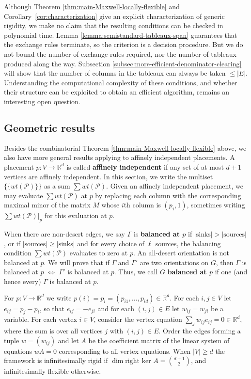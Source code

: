 \documentclass[11pt,letterpaper]{amsart}
\theoremstyle{definition}
\begin{document}
Although Theorem \ref{thm:main-Maxwell-locally-flexible} and Corollary~\ref{cor:characterization} give an explicit characterization of generic rigidity, we make no claim that the resulting conditions can be checked in polynomial time. Lemma \ref{lemma:semistandard-tableaux-span} guarantees that the exchange rules terminate, so the criterion is a decision procedure.
But we do not bound the number of exchange rules required, nor the number of tableaux produced along the way. Subsection \ref{subsec:more-efficient-denominator-clearing} will show that the number of columns in the tableaux can always be taken $\leq |E|$.
Understanding the computational complexity of these conditions, and whether their structure can be exploited to obtain an efficient algorithm, remains an interesting open question.


\subsection{Geometric results}
Besides the combinatorial Theorem \ref{thm:main-Maxwell-locally-flexible} above, we also have more general results applying to affinely independent placements. A placement $p:V \to \mathbb{R}^d$ is called \textbf{affinely independent} if any set of at most $d+1$ vertices are affinely independent. In this section, we write the multiset $\{\{ wt(\mathcal{P}) \}\}$ as a sum $\sum wt(\mathcal{P})$. Given an affinely independent placement, we may evaluate $\sum wt(\mathcal{P})$ at $p$ by replacing each column with the corresponding maximal minor of the matrix $M$ whose $i$th column is $(p_i, 1)$, sometimes writing $\sum wt(\mathcal{P})|_p$ for this evaluation at $p$.

When there are non-desert edges, we say $\Gamma$ is \textbf{balanced at $p$} if $|\text{sinks}| > |\text{sources}|$, or if $|\text{sources}| \geq |\text{sinks}|$ and for every choice of $\ell$ sources, the balancing condition $\sum wt(\mathcal{P})$ evaluates to zero at $p$. An all-desert orientation is not balanced at $p$. We will prove that if $\Gamma$ and $\Gamma'$ are two orientations on $G$, then $\Gamma$ is balanced at $p$ $\iff$ $\Gamma'$ is balanced at $p$. Thus, we call $G$ \textbf{balanced at $p$} if one (and hence every) $\Gamma$ is balanced at $p$. 

For $p:V \to \mathbb{R}^d$ we write $p(i)=p_i = (p_{i1},\dots, p_{id}) \in \mathbb{R}^d$.
For each $i,j \in V$ let $e_{ij} = p_j - p_i$, so that $e_{ij} = -e_{ji}$ and for each $(i,j) \in E$ let $w_{ij}=w_{ji}$ be a variable. For each vertex $i \in V$, consider the vertex equation $\sum_j w_{ij} e_{ij} = 0 \in \mathbb{R}^d$, where the sum is over all vertices $j$ with $(i,j) \in E$. Order the edges forming a tuple $w = (w_{ij})$ and let $A$ be the coefficient matrix of the linear system of equations $wA = 0$ corresponding to all vertex equations. When $|V| \geq d$ the framework is infinitesimally rigid if $\dim \text{right ker } A = \binom{d+1}{2}$, and infinitesimally flexible otherwise. 
\end{document}
